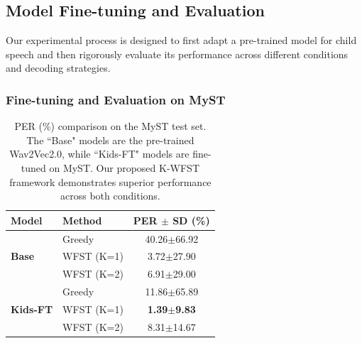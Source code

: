 

\subsection{Model Fine-tuning and Evaluation}
Our experimental process is designed to first adapt a pre-trained model for child speech and then rigorously evaluate its performance across different conditions and decoding strategies.

\subsubsection{Fine-tuning and Evaluation on MyST}

\begin{table}[h]
\centering
\caption{PER (\%) comparison on the MyST test set. The ``Base" models are the pre-trained Wav2Vec2.0, while ``Kids-FT" models are fine-tuned on MyST. Our proposed K-WFST framework demonstrates superior performance across both conditions.}
\vspace{-2mm}
\begin{tabular}{llc}
\toprule
\textbf{Model} & \textbf{Method} & \textbf{PER $\pm$ SD (\%) } \\
\midrule
\multirow{3}{*}{\textbf{Base}} 
& Greedy & 40.26$\pm$66.92 \\
& WFST (K=1) & 3.72$\pm$27.90 \\
& WFST (K=2) & 6.91$\pm$29.00 \\
\midrule
\multirow{3}{*}{\textbf{Kids-FT}}
& Greedy & 11.86$\pm$65.89 \\
& WFST (K=1) & \textbf{1.39$\pm$9.83} \\
& WFST (K=2) & 8.31$\pm$14.67 \\
\bottomrule
\end{tabular}
\label{tab:model-eval-results}
\vspace{-4mm}
\end{table}


